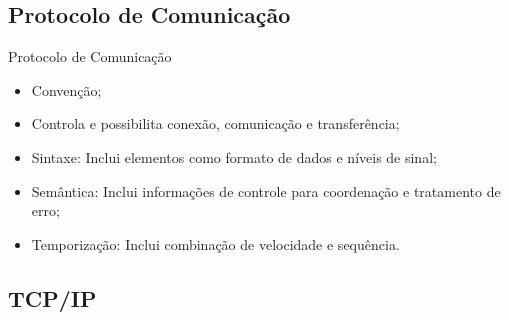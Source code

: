 \begin{comment}
\begin{frame}{Protocolo}
		\begin{block}{Definição de Protocolo}
		\begin{enumerate}
			\item Ata, nota ou registro dos documentos governamentais, dos 
			atos oficiais, da correspondência de um governo ou tribunal, de uma 
			empresa, universidade etc.
			\item Subdivisão de uma repartição pública (ou empresa privada) em 
			que se registram e/ou se recebem os requerimentos, documentos ou 
			processos.
			\item Recibo que registra o número e a data em que um processo ou 
			requerimento foi catalogado e registrado.
			\item Acordo regulamentado entre países ou empresas: protocolo 
			internacional.
		\end{enumerate}
	\end{block}
\end{frame}
\end{comment}

\subsection*{Protocolo de Comunicação}

\begin{frame}{Protocolo de Comunicação}
	\begin{itemize}
		\item Convenção; \pause
		\item Controla e possibilita conexão, comunicação e transferência; 
		\pause
		\item Sintaxe: Inclui elementos como formato de dados e níveis de 
		sinal; \pause
		\item Semântica: Inclui informações de controle para coordenação e 
		tratamento de erro; \pause
		\item Temporização: Inclui combinação de velocidade e sequência.
	\end{itemize}
\end{frame}

\subsection*{TCP/IP}

